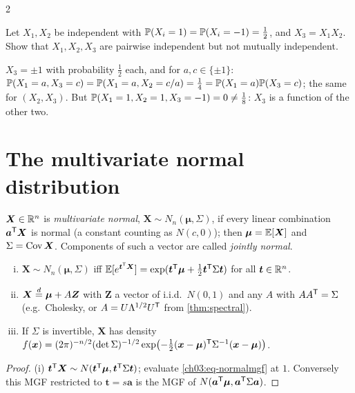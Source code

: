 \begin{paracol}{2}
\begin{exercise}\label{ch03:ex-pairwise}
Let $X_1,X_2$ be independent with $\mathbb{P}(X_i=1)=\mathbb{P}(X_i=-1)=\frac12$, and $X_3=X_1X_2$. Show that $X_1,X_2,X_3$ are pairwise
independent but not mutually independent.
\end{exercise}
\begin{solution}[ch03:ex-pairwise]
$X_3=\pm1$ with probability $\frac12$ each, and for $a,c\in\{\pm1\}$: $\mathbb{P}(X_1=a,X_3=c)=\mathbb{P}(X_1=a,X_2=c/a)=\frac14=\mathbb{P}(X_1=a)\mathbb{P}(X_3=c)$;
the same for $(X_2,X_3)$. But $\mathbb{P}(X_1=1,X_2=1,X_3=-1)=0\ne\frac18$: $X_3$ is a function of the other two.
\end{solution}

\section{The multivariate normal distribution}\label{ch03:sec-mvn}

\begin{definition}
$\bm X\in\mathbb{R}^n$ is \emph{multivariate normal}, $\bm X\sim N_n(\bm\mu,\Sigma)$, if every linear combination $\bm a^{\mathsf T}\bm X$ is
normal (a constant counting as $N(c,0)$); then $\bm\mu=\mathbb{E}[\bm X]$ and $\Sigma=\operatorname{Cov}\bm X$. Components of such a vector are
called \emph{jointly normal}.
\end{definition}

\begin{proposition}\label{ch03:prop-mvn}
\leavevmode
\begin{enumerate}[(i)]
  \item $\bm X\sim N_n(\bm\mu,\Sigma)$ iff $\mathbb{E}[e^{\bm t^{\mathsf T}\bm X}]=\exp(\bm t^{\mathsf T}\bm\mu+\frac12\bm t^{\mathsf T}\Sigma\bm t)$ for all $\bm t\in\mathbb{R}^n$.
  \item $\bm X\stackrel{d}{=}\bm\mu+A\bm Z$ with $\bm Z$ a vector of i.i.d.\ $N(0,1)$ and any $A$ with $AA^{\mathsf T}=\Sigma$ (e.g.\ Cholesky, or
        $A=U\Lambda^{1/2}U^{\mathsf T}$ from \cref{thm:spectral}).
  \item If $\Sigma$ is invertible, $\bm X$ has density
        $f(\bm x)=(2\pi)^{-n/2}(\det\Sigma)^{-1/2}\exp\bigl(-\frac12(\bm x-\bm\mu)^{\mathsf T}\Sigma^{-1}(\bm x-\bm\mu)\bigr)$.
\end{enumerate}
\end{proposition}
\begin{proof}
(i) $\bm t^{\mathsf T}\bm X\sim N(\bm t^{\mathsf T}\bm\mu,\bm t^{\mathsf T}\Sigma\bm t)$; evaluate \eqref{ch03:eq-normalmgf} at $1$. Conversely this MGF restricted to
$\bm t=s\bm a$ is the MGF of $N(\bm a^{\mathsf T}\bm\mu,\bm a^{\mathsf T}\Sigma\bm a)$.


\end{proof}
\end{paracol}
